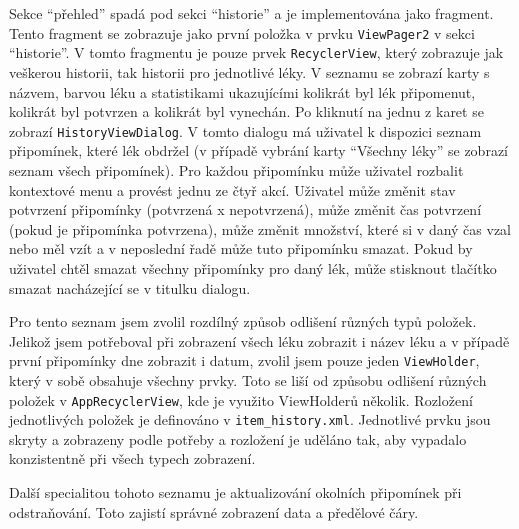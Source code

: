 \documentclass[../TakeYourPill.tex]{subfiles}
\begin{document}
Sekce \enquote{přehled} spadá pod sekci \enquote{historie} a je implementována jako fragment. Tento fragment se zobrazuje jako první položka v prvku \texttt{ViewPager2} v sekci \enquote{historie}. V tomto fragmentu je pouze prvek \texttt{RecyclerView}, který zobrazuje jak veškerou historii, tak historii pro jednotlivé léky. V seznamu se zobrazí karty s názvem, barvou léku a statistikami ukazujícími kolikrát byl lék připomenut, kolikrát byl potvrzen a kolikrát byl vynechán. Po kliknutí na jednu z karet se zobrazí \texttt{HistoryViewDialog}\label{sec:historydialog}. V tomto dialogu má uživatel k dispozici seznam připomínek, které lék obdržel (v případě vybrání karty \enquote{Všechny léky} se zobrazí seznam všech připomínek). Pro každou připomínku může uživatel rozbalit kontextové menu a provést jednu ze čtyř akcí. Uživatel může změnit stav potvrzení připomínky (potvrzená x nepotvrzená), může změnit čas potvrzení (pokud je připomínka potvrzena), může změnit množství, které si v daný čas vzal nebo měl vzít a v neposlední řadě může tuto připomínku smazat. Pokud by uživatel chtěl smazat všechny připomínky pro daný lék, může stisknout tlačítko smazat nacházející se v titulku dialogu.

Pro tento seznam jsem zvolil rozdílný způsob odlišení různých typů položek. Jelikož jsem potřeboval při zobrazení všech léku zobrazit i název léku a v případě první připomínky dne zobrazit i datum, zvolil jsem pouze jeden \texttt{ViewHolder}, který v sobě obsahuje všechny prvky. Toto se liší od způsobu odlišení různých položek v \texttt{AppRecyclerView}, kde je využito ViewHolderů několik. Rozložení jednotlivých položek je definováno v \texttt{item\_history.xml}. Jednotlivé prvku jsou skryty a zobrazeny podle potřeby a rozložení je uděláno tak, aby vypadalo konzistentně při všech typech zobrazení.

Další specialitou tohoto seznamu je aktualizování okolních připomínek při odstraňování. Toto zajistí správné zobrazení data a předělové čáry.
\end{document}

